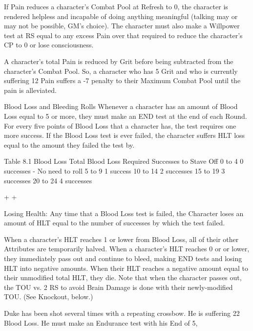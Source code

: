 \documentclass[oneside,11pt,english]{book}
\begin{document}
 

If Pain reduces a character’s Combat Pool at Refresh to 0, the character is rendered helpless and 
incapable of doing anything meaningful (talking may or may not be possible, GM’s choice). The 
character must also make a Willpower test at RS equal to any excess Pain over that required to reduce 
the character’s CP to 0 or lose consciousness. 

 

A character’s total Pain is reduced by Grit before being subtracted from the character’s Combat Pool. 
So, a character who has 5 Grit and who is currently suffering 12 Pain suffers a -7 penalty to their 
Maximum Combat Pool until the pain is alleviated. 

 

Blood Loss and Bleeding Rolls 
Whenever a character has an amount of Blood Loss equal to 5 or more, they must make an END test at 
the end of each Round. For every five points of Blood Loss that a character has, the test requires one more 
success. If the Blood Loss test is ever failed, the character suffers HLT loss equal to the amount they 
failed the test by. 

 
Table 8.1 Blood Loss 
Total Blood Loss Required Successes to Stave Off 
0 to 4 0 successes - No need to roll 
5 to 9 1 success 
10 to 14 2 successes 
15 to 19 3 successes 
20 to 24 4 successes 

+ + 

 

 


Losing Health: 
Any time that a Blood Loss test is failed, the Character loses an amount of HLT equal to the number of 
successes by which the test failed. 

 

When a character's HLT reaches 1 or lower from Blood Loss, all of their other Attributes are temporarily 
halved. When a character’s HLT reaches 0 or or lower, they immediately pass out and continue to bleed, 
making END tests and losing HLT into negative amounts. When their HLT reaches a negative amount 
equal to their unmodified total HLT, they die. Note that when the character passes out, the TOU vs. 2 RS 
to avoid Brain Damage is done with their newly-modified TOU. (See Knockout, below.) 

 

Duke has been shot several times with a repeating crossbow. He is suffering 22 Blood Loss. He must 
make an Endurance test with his End of 5, 

 
\end{document}
